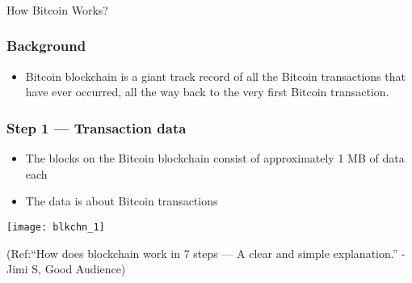 \begin{frame}[fragile]\frametitle{}
\begin{center}
{\Large How Bitcoin Works?}
\end{center}
\end{frame}

\begin{frame}[fragile]\frametitle{Background}
\begin{itemize}
\item Bitcoin blockchain is a giant track record of all the Bitcoin transactions that have ever occurred, all the way back to the very first Bitcoin transaction.
\end{itemize}


\end{frame}

\begin{frame}[fragile]\frametitle{Step 1 — Transaction data}
\begin{itemize}
\item The blocks on the Bitcoin blockchain consist of approximately 1 MB of data each
\item The data is about Bitcoin transactions
\end{itemize}

\begin{center}
\texttt{[image: blkchn\_1]}

{\tiny (Ref:``How does blockchain work in 7 steps — A clear and simple explanation.'' - Jimi S, Good Audience)}
\end{center}

\end{frame}

